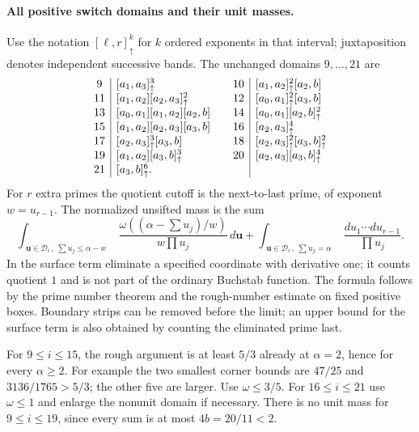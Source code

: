 \documentclass[11pt]{article}
\begin{document}
\paragraph{All positive switch domains and their unit masses.}
Use the notation $[\ell,r]^k_\uparrow$ for $k$ ordered exponents
in that interval; juxtaposition denotes independent successive bands.
The unchanged domains $9,\ldots,21$ are
\[
\begin{array}{c|l@{\qquad}c|l}
9&[a_1,a_3]^3_\uparrow&10&[a_1,a_2]^2_\uparrow[a_2,b]\\
11&[a_1,a_2][a_2,a_3]^2_\uparrow&12&[a_0,a_1]^2_\uparrow[a_3,b]\\
13&[a_0,a_1][a_1,a_2][a_2,b]&14&[a_0,a_1][a_2,b]^2_\uparrow\\
15&[a_1,a_2][a_2,a_3][a_3,b]&16&[a_2,a_3]^4_\uparrow\\
17&[a_2,a_3]^3_\uparrow[a_3,b]&18&[a_2,a_3]^2_\uparrow[a_3,b]^2_\uparrow\\
19&[a_1,a_2][a_3,b]^3_\uparrow&20&[a_2,a_3][a_3,b]^4_\uparrow\\
21&[a_3,b]^6_\uparrow.&&
\end{array}
\]
For $r$ extra primes the quotient cutoff is the next-to-last prime,
of exponent $w=u_{r-1}$.  The normalized unsifted mass is the sum
\begin{equation}\label{eq:second-seed-full-mass}
 \int_{\substack{\boldsymbol u\in\mathcal D_i\,,\ \sum u_j\le\alpha-w}}
 \frac{\omega((\alpha-\sum u_j)/w)}{w\prod u_j}\,d\boldsymbol u
 +\int_{\substack{\boldsymbol u\in\mathcal D_i\,,\ \sum u_j=\alpha}}
             \frac{du_1\cdots du_{r-1}}{\prod u_j}.
\end{equation}
In the surface term eliminate a specified coordinate with derivative
one; it counts quotient $1$ and is not part of the ordinary Buchstab
function.  The formula follows by the prime number theorem and the
rough-number estimate on fixed positive boxes.  Boundary strips can
be removed before the limit; an upper bound for the surface term is
also obtained by counting the eliminated prime last.

For $9\le i\le15$, the rough argument is at least $5/3$ already at
$\alpha=2$, hence for every $\alpha\ge2$.
For example the two smallest corner bounds are $47/25$ and
$3136/1765>5/3$; the other five are larger.
Use $\omega\le3/5$.  For $16\le i\le21$ use $\omega\le1$ and
enlarge the nonunit domain if necessary.  There is no unit mass for
$9\le i\le19$, since every sum is at most $4b=20/11<2$.
\end{document}
